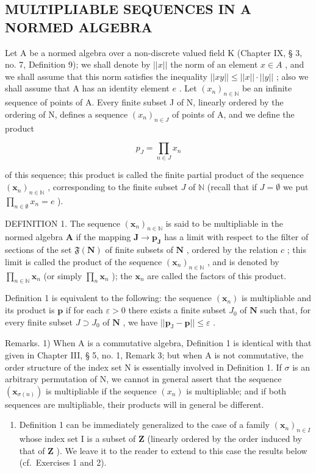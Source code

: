 \subsection{MULTIPLIABLE SEQUENCES IN A NORMED ALGEBRA}

Let A be a normed algebra over a non-discrete valued field K (Chapter IX, § 3, no. 7, Definition 9); we shall denote by \(||x||\) the norm of an element \(x \in A\) , and we shall assume that this norm satisfies the inequality \(||xy|| \leqslant ||x|| \cdot ||y||\) ; also we shall assume that A has an identity element \(e\) . Let \((x_n)_{n \in \mathbb{N}}\) be an infinite sequence of points of A. Every finite subset J of N, linearly ordered by the ordering of N, defines a sequence \((x_n)_{n \in J}\) of points of A, and we define the product

\[
p _ {J} = \prod_ {n \in J} x _ {n}
\]

of this sequence; this product is called the finite partial product of the sequence \((\pmb{x}_n)_{n\in \mathbb{N}}\) , corresponding to the finite subset \(J\) of \(\mathbb{N}\) (recall that if \(J = \emptyset\) we put \(\prod_{n\in \emptyset}x_n = e\) ).

DEFINITION 1. The sequence \((\pmb{x}_n)_{n\in \mathbb{N}}\) is said to be multipliable in the normed algebra \(\mathbf{A}\) if the mapping \(\mathbf{J}\to \pmb{p}_{\mathbf{J}}\) has a limit with respect to the filter of sections of the set \(\mathfrak{F}(\mathbf{N})\) of finite subsets of \(\mathbf{N}\) , ordered by the relation \(c\) ; this limit is called the product of the sequence \((\pmb{x}_n)_{n\in \mathbb{N}}\) , and is denoted by \(\prod_{n\in \mathbb{N}}\pmb{x}_n\) (or simply \(\prod_{n}\pmb{x}_n\) ); the \(\pmb{x}_n\) are called the factors of this product.

Definition 1 is equivalent to the following: the sequence \((\pmb{x}_n)\) is multipliable and its product is \(\pmb{p}\) if for each \(\varepsilon > 0\) there exists a finite subset \(J_0\) of \(\mathbf{N}\) such that, for every finite subset \(J \supset J_0\) of \(\mathbf{N}\) , we have \(||\pmb{p}_{\mathrm{J}} - \pmb{p}|| \leqslant \varepsilon\) .

Remarks. 1) When A is a commutative algebra, Definition 1 is identical with that given in Chapter III, § 5, no. 1, Remark 3; but when A is not commutative, the order structure of the index set N is essentially involved in Definition 1. If \(\sigma\) is an arbitrary permutation of N, we cannot in general assert that the sequence \((\pmb{x}_{\sigma(n)})\) is multipliable if the sequence \((x_{n})\) is multipliable; and if both sequences are multipliable, their products will in general be different.

\begin{enumerate}
\def\labelenumi{\arabic{enumi})}
\setcounter{enumi}{1}
\tightlist
\item
  Definition 1 can be immediately generalized to the case of a family \((\pmb{x}_n)_{n\in I}\) whose index set I is a subset of \(\mathbf{Z}\) (linearly ordered by the order induced by that of \(\mathbf{Z}\) ). We leave it to the reader to extend to this case the results below (cf.~Exercises 1 and 2).
\end{enumerate}

